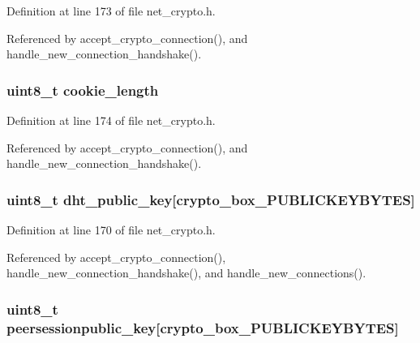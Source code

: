 Definition at line 173 of file net\+\_\+crypto.\+h.



Referenced by accept\+\_\+crypto\+\_\+connection(), and handle\+\_\+new\+\_\+connection\+\_\+handshake().

\hypertarget{struct_new___connection_a801672aeddedd60f76a667a2275a95ce}{
\subsubsection[{cookie\+\_\+length}]{\setlength{\rightskip}{0pt plus 5cm}uint8\+\_\+t cookie\+\_\+length}}\label{struct_new___connection_a801672aeddedd60f76a667a2275a95ce}


Definition at line 174 of file net\+\_\+crypto.\+h.



Referenced by accept\+\_\+crypto\+\_\+connection(), and handle\+\_\+new\+\_\+connection\+\_\+handshake().

\hypertarget{struct_new___connection_ab2ecaa07625ad0ed5e07d3a1f0dcc939}{
\subsubsection[{dht\+\_\+public\+\_\+key}]{\setlength{\rightskip}{0pt plus 5cm}uint8\+\_\+t dht\+\_\+public\+\_\+key\mbox{[}crypto\+\_\+box\+\_\+\+P\+U\+B\+L\+I\+C\+K\+E\+Y\+B\+Y\+T\+E\+S\mbox{]}}}\label{struct_new___connection_ab2ecaa07625ad0ed5e07d3a1f0dcc939}


Definition at line 170 of file net\+\_\+crypto.\+h.



Referenced by accept\+\_\+crypto\+\_\+connection(), handle\+\_\+new\+\_\+connection\+\_\+handshake(), and handle\+\_\+new\+\_\+connections().

\hypertarget{struct_new___connection_ac040d4ba2a22ee327952009e7396bb2f}{
\subsubsection[{peersessionpublic\+\_\+key}]{\setlength{\rightskip}{0pt plus 5cm}uint8\+\_\+t peersessionpublic\+\_\+key\mbox{[}crypto\+\_\+box\+\_\+\+P\+U\+B\+L\+I\+C\+K\+E\+Y\+B\+Y\+T\+E\+S\mbox{]}}}\label{struct_new___connection_ac040d4ba2a22ee327952009e7396bb2f}


